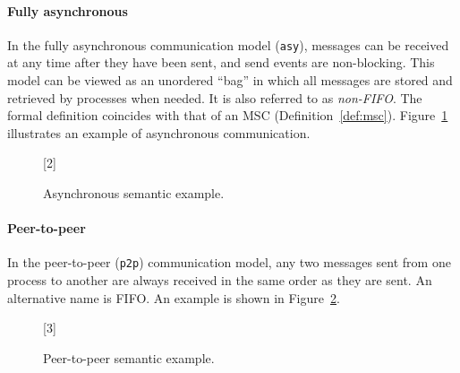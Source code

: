 \paragraph{Fully asynchronous}

In the fully asynchronous communication model (\verb|asy|), messages can be 
received at any time after they have been sent, and send events are 
non-blocking. This model can be viewed as an unordered ``bag'' in which 
all messages are stored and retrieved by processes when needed. It is also 
referred to as \emph{non-FIFO}. The formal definition coincides with that of 
an MSC (Definition~\ref{def:msc}). Figure~\ref{fig:asy} illustrates an example of asynchronous 
communication.

\begin{figure}[!ht]
    \centering
      \begin{msc}[draw frame=none, draw head=none, msc keyword=, 
                  head height=0px, label distance=0.5ex, 
                  foot height=0px, foot distance=0px]{}

          [2]
          \nextlevel
      \end{msc}
  \caption{Asynchronous semantic example.}
  \label{fig:asy}
\end{figure}

\paragraph{Peer-to-peer} 
In the peer-to-peer (\verb|p2p|) communication model, any two messages sent from one 
process to another are always received in the same order as they are sent.
An alternative name is FIFO. An example is shown in Figure~\ref{fig:p2p}.

\begin{figure}[!ht]
    \centering
      \begin{msc}[draw frame=none, draw head=none, msc keyword=, 
                    head height=0px, label distance=0.5ex, 
                    foot height=0px, foot distance=0px]{}

            [3]
            \nextlevel
            \nextlevel
        \end{msc}
  \caption{Peer-to-peer semantic example.}
  \label{fig:p2p}
\end{figure}


